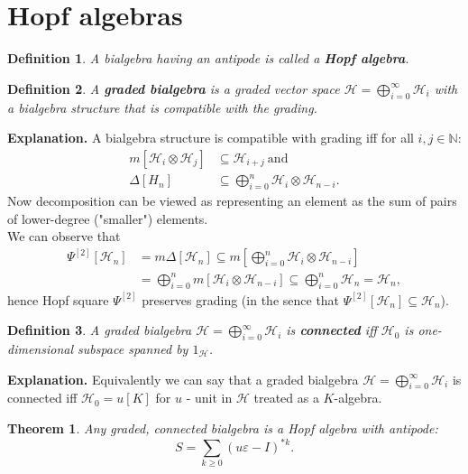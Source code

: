 \documentclass[a4paper, 12pt]{report}
\newtheorem{definition}{Definition}
\newtheorem{theorem}{Theorem}
\begin{document}
\section{Hopf algebras}
\begin{definition}
A bialgebra having an antipode is called a \textbf{Hopf algebra}.
\end{definition}
\begin{definition}
A \textbf{graded bialgebra} is a graded vector space
$\mathcal{H} = \displaystyle\bigoplus^{\infty}_{i=0}\mathcal{H}_i$ with a bialgebra structure that is
compatible with the grading.
\end{definition}
\textbf{Explanation. } A bialgebra structure is compatible with grading iff for all $i, j \in \mathbb{N}$:
\begin{align*}
m[\mathcal{H}_i \otimes \mathcal{H}_j] &\subseteq \mathcal{H}_{i+j} \mathrm{\ and} \\
\Delta[H_n] &\subseteq \bigoplus^{n}_{i = 0} \mathcal{H}_i \otimes \mathcal{H}_{n-i}.
\end{align*}
\indent Now decomposition can be viewed as representing an element as the sum of pairs of lower-degree
("smaller") elements. \\
\indent We can observe that
\begin{align*}
\Psi^{[2]}[\mathcal{H}_n] &= m\Delta[\mathcal{H}_n] \subseteq m[\bigoplus^n_{i = 0} \mathcal{H}_i \otimes
\mathcal{H}_{n - i}] \\ &= \bigoplus^n_{i = 0} m[\mathcal{H}_i \otimes \mathcal{H}_{n - i}] \subseteq
\bigoplus^n_{i = 0} \mathcal{H}_n = \mathcal{H}_n,
\end{align*}
hence Hopf square $\Psi^{[2]}$ preserves grading
(in the sence that $\Psi^{[2]}[\mathcal{H}_n] \subseteq \mathcal{H}_n$).
\begin{definition}
A graded bialgebra $\mathcal{H} = \displaystyle\bigoplus^{\infty}_{i=0}\mathcal{H}_i$ is
\textbf{connected} iff $\mathcal{H}_0$ is one-dimensional subspace spanned by $1_\mathcal{H}$.
\end{definition}
\noindent \textbf{Explanation. } Equivalently we can say that a graded bialgebra
$\mathcal{H} = \displaystyle\bigoplus^{\infty}_{i=0}\mathcal{H}_i$ is
connected iff $\mathcal{H}_0 = u[K]$ for $u$ - unit in $\mathcal{H}$ treated as a $K$-algebra.
\begin{theorem}
Any graded, connected bialgebra is a Hopf algebra with antipode:
\begin{equation*}
S = \sum_{k \geq 0} (u\varepsilon - I)^{*k}.
\end{equation*}
\end{theorem}
\end{document}
